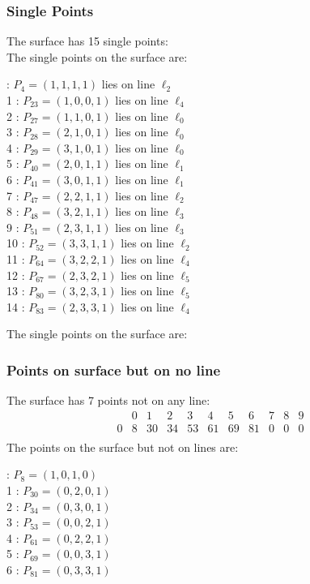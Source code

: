 \documentclass{article}
\begin{document}
{\subsubsection*{Single Points}
The surface has 15 single points:\\
The single points on the surface are:\\
\begin{multicols}{2}
 : $P_{4}=( 1, 1, 1, 1 )$ lies on line $\ell_{2}$\\
1 : $P_{23}=( 1, 0, 0, 1 )$ lies on line $\ell_{4}$\\
2 : $P_{27}=( 1, 1, 0, 1 )$ lies on line $\ell_{0}$\\
3 : $P_{28}=( 2, 1, 0, 1 )$ lies on line $\ell_{0}$\\
4 : $P_{29}=( 3, 1, 0, 1 )$ lies on line $\ell_{0}$\\
5 : $P_{40}=( 2, 0, 1, 1 )$ lies on line $\ell_{1}$\\
6 : $P_{41}=( 3, 0, 1, 1 )$ lies on line $\ell_{1}$\\
7 : $P_{47}=( 2, 2, 1, 1 )$ lies on line $\ell_{2}$\\
8 : $P_{48}=( 3, 2, 1, 1 )$ lies on line $\ell_{3}$\\
9 : $P_{51}=( 2, 3, 1, 1 )$ lies on line $\ell_{3}$\\
10 : $P_{52}=( 3, 3, 1, 1 )$ lies on line $\ell_{2}$\\
11 : $P_{64}=( 3, 2, 2, 1 )$ lies on line $\ell_{4}$\\
12 : $P_{67}=( 2, 3, 2, 1 )$ lies on line $\ell_{5}$\\
13 : $P_{80}=( 3, 2, 3, 1 )$ lies on line $\ell_{5}$\\
14 : $P_{83}=( 2, 3, 3, 1 )$ lies on line $\ell_{4}$\\
\end{multicols}
The single points on the surface are:\\
\subsubsection*{Points on surface but on no line}
The surface has 7 points not on any line:\\
$$
\begin{array}{r|*{10}{r}}
 & 0 & 1 & 2 & 3 & 4 & 5 & 6 & 7 & 8 & 9\\
\hline
0 & 8 & 30 & 34 & 53 & 61 & 69 & 81 & 0 & 0 & 0\\
\end{array}
$$
The points on the surface but not on lines are:\\
\begin{multicols}{2}
 : $P_{8}=( 1, 0, 1, 0 )$\\
1 : $P_{30}=( 0, 2, 0, 1 )$\\
2 : $P_{34}=( 0, 3, 0, 1 )$\\
3 : $P_{53}=( 0, 0, 2, 1 )$\\
4 : $P_{61}=( 0, 2, 2, 1 )$\\
5 : $P_{69}=( 0, 0, 3, 1 )$\\
6 : $P_{81}=( 0, 3, 3, 1 )$\\
\end{multicols}
}
\end{document}
